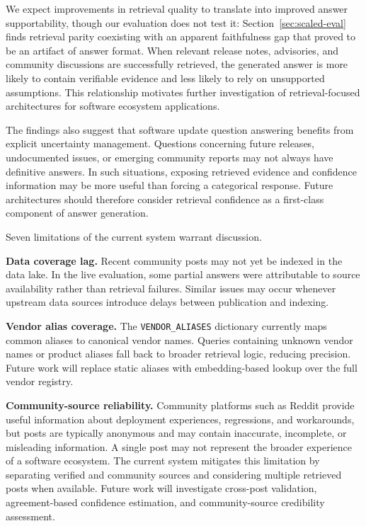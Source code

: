 \documentclass[acmsmall,review,anonymous,screen]{acmart}
\begin{document}
We expect improvements in retrieval quality to translate into improved answer
supportability, though our evaluation does not test it: Section~\ref{sec:scaled-eval}
finds retrieval parity coexisting with an apparent faithfulness gap that proved
to be an artifact of answer format. When relevant release
notes, advisories, and community discussions are successfully
retrieved, the generated answer is more likely to contain verifiable
evidence and less likely to rely on unsupported assumptions. This
relationship motivates further investigation of retrieval-focused
architectures for software ecosystem applications.

The findings also suggest that software update question answering
benefits from explicit uncertainty management. Questions concerning
future releases, undocumented issues, or emerging community reports may
not always have definitive answers. In such situations, exposing
retrieved evidence and confidence information may be more useful than
forcing a categorical response. Future architectures should therefore
consider retrieval confidence as a first-class component of answer
generation.

Seven limitations of the current system warrant discussion.

\textbf{Data coverage lag.}
Recent community posts may not yet be indexed in the data lake. In the
live evaluation, some partial answers were attributable to source
availability rather than retrieval failures. Similar issues may occur
whenever upstream data sources introduce delays between publication and
indexing.

\textbf{Vendor alias coverage.}
The \texttt{VENDOR\_ALIASES} dictionary currently maps common aliases
to canonical vendor names. Queries containing unknown vendor names or
product aliases fall back to broader retrieval logic, reducing
precision. Future work will replace static aliases with embedding-based
lookup over the full vendor registry.

\textbf{Community-source reliability.}
Community platforms such as Reddit provide useful information about
deployment experiences, regressions, and workarounds, but posts are
typically anonymous and may contain inaccurate, incomplete, or
misleading information. A single post may not represent the broader
experience of a software ecosystem. The current system mitigates this
limitation by separating verified and community sources and considering
multiple retrieved posts when available. Future work will investigate
cross-post validation, agreement-based confidence estimation, and
community-source credibility assessment.
\end{document}
